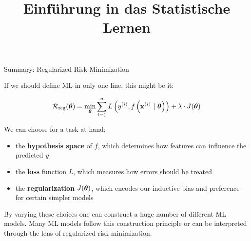 



\newcommand{\titlefigure}{figure_man/bayes_reg.png}
\newcommand{\learninggoals}{
  \item Understand that regularization and parameter shrinkage can be applied to non-linear models
  \item Know structural risk minimization
  \item Know how regularization risk minimization is the same as MAP
      in a Bayesian perspective, where the penality corresponds to parameter prior.
}

\title{Einführung in das Statistische Lernen}
\date{}





\begin{vbframe}{Summary: Regularized Risk Minimization}

If we should define ML in only one line, this might be it:

$$
\mathcal{R}_{\text{reg}}(\bm{\theta})= \min_{\bm{\theta}} \sum\limits_{i=1}^n L\left(y^{(i)}, f\left(\mathbf{x}^{(i)} ~|~ \bm{\theta}\right)\right) + \lambda \cdot J(\bm{\theta})
$$

We can choose for a task at hand:

\begin{itemize}
  \item the \textbf{hypothesis space} of $f$, which determines how features can
  influence the predicted $y$
  \item the \textbf{loss} function $L$, which measures how errors should be treated
  \item the \textbf{regularization} $J(\bm{\theta})$, which encodes our inductive
  bias and preference for certain simpler models
\end{itemize}

\vfill

By varying these choices one can construct a huge number of different ML models.
Many ML models follow this construction principle or can be interpreted through
the lens of regularized risk minimization.

\end{vbframe}


